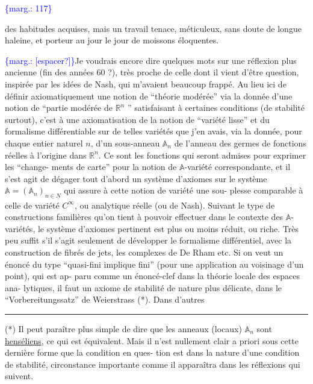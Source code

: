 \documentclass[11pt]{article}
\newcommand{\scanpage}[1]{\par\bigskip\noindent{\small\sffamily[scan #1]}\par}
\newcommand{\mspage}[1]{{\small\sffamily[p.\,#1]}}
\newcommand{\margin}[1]{\textcolor{blue}{\{\textsf{marg.:} #1\}}}
\newcommand{\uline}[1]{\underline{#1}}
\newcommand{\unsure}[1]{[#1?]}
\begin{document}
\margin{117}

\clearpage
\scanpage{119/118}
\mspage{40}

des habitudes acquises, mais un travail tenace, méticuleux, sans
doute de longue haleine, et porteur au jour le jour de moissons
éloquentes.

\margin{\unsure{espacer}}Je voudrais encore dire quelques mots sur une réflexion
plus ancienne (fin des années 60 ?), très proche de celle dont il
vient d'être question, inspirée par les idées de Nash, qui m'avaient
beaucoup frappé. Au lieu ici de définir axiomatiquement une notion
de ``théorie modérée'' via la donnée d'une notion de ``partie modérée
de $\mathbb{R}^n$ '' satisfaisant à certaines conditions (de stabilité surtout),
c'est à une axiomatisation de la notion de ``variété lisse'' et du
formalisme différentiable sur de telles variétés que j'en avais,
via la donnée, pour chaque entier naturel $n$, d'un sous-anneau
$\mathbb{A}_n$ de l'anneau des germes de fonctions réelles à l'origine dans $\mathbb{R}^n$.
Ce sont les fonctions qui seront admises pour exprimer les ``change-%
ments de carte'' pour la notion de $\mathbb{A}$-variété correspondante, et il
s'est agit de dégager tout d'abord un système d'axiomes sur le
système $\mathbb{A} = (\mathbb{A}_n)_{n\in\underline{N}}$ qui assure à cette notion de variété une sou-%
plesse comparable à celle de variété $C^\infty$, ou analytique réelle
(ou de Nash). Suivant le type de constructions familières qu'on
tient à pouvoir effectuer dans le contexte des $\mathbb{A}$-variétés, le
système d'axiomes pertinent est plus ou moins réduit, ou riche.
Très peu suffit s'il s'agit seulement de développer le formalisme
différentiel, avec la construction de fibrés de jets, les complexes
de De Rham etc. Si on veut un énoncé du type ``quasi-fini implique
fini'' (pour une application au voisinage d'un point), qui est ap-%
paru comme un énoncé-clef dans la théorie locale des espaces ana-%
lytiques, il faut un axiome de stabilité de nature plus délicate,
dans le ``Vorbereitungssatz'' de Weierstrass (*). Dans d'autres

\rule{4cm}{0.4pt}

(*) Il peut paraître plus simple de dire que les anneaux (locaux)
$\mathbb{A}_n$ sont \uline{henséliens}, ce qui est équivalent. Mais il n'est nullement
clair a priori sous cette dernière forme que la condition en ques-%
tion est dans la nature d'une condition de stabilité, circonstance
importante comme il apparaîtra dans les réflexions qui suivent.
\end{document}
